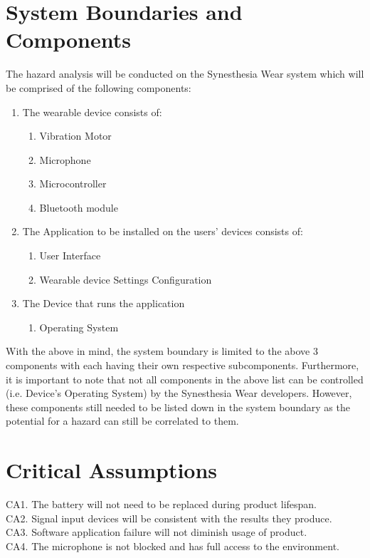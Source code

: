 \documentclass{article}
\begin{document}
\section{System Boundaries and Components}
The hazard analysis will be conducted on the Synesthesia Wear system which will be 
comprised of the following components:
\begin{enumerate}
    \item The wearable device consists of:
    \begin{enumerate}
        \item Vibration Motor
        \item Microphone
        \item Microcontroller
        \item Bluetooth module
    \end{enumerate}
    \item The Application to be installed on the users' devices consists of:
    \begin{enumerate}
        \item User Interface
        \item Wearable device Settings Configuration
    \end{enumerate}
    \item The Device that runs the application
    \begin{enumerate}
        \item Operating System
    \end{enumerate}
\end{enumerate}

\noindent With the above in mind, the system boundary is limited to the above 3 components with 
each having their own respective subcomponents. Furthermore, it is important to note 
that not all components in the above list can be controlled (i.e. Device's Operating 
System) by the Synesthesia Wear developers. However, these components still needed to 
be listed down in the system boundary as the potential for a hazard can still be 
correlated to them.

\section{Critical Assumptions}

CA1. The battery will not need to be replaced during product lifespan.
\\CA2. Signal input devices will be consistent with the results they produce.
\\CA3. Software application failure will not diminish usage of product.
\\CA4. The microphone is not blocked and has full access to the environment. 
\end{document}
